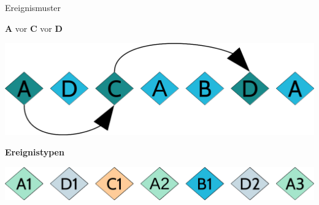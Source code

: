 \documentclass{beamer}
\begin{document}
\begin{frame}{Ereignismuster}

\begin{exampleblock}{}
    \begin{center}
        \textbf{A} vor \textbf{C} vor \textbf{D}    
    \end{center}
\end{exampleblock}

\begin{center}
    \includegraphics[scale=0.3]{img/03_cep}
\end{center}
\begin{exampleblock}{}
    \begin{center}
        \textbf{Ereignistypen}  
    \end{center}
\end{exampleblock}


\begin{center}
    \includegraphics[scale=0.3]{img/04_cep}
\end{center}

\end{frame}
\end{document}
